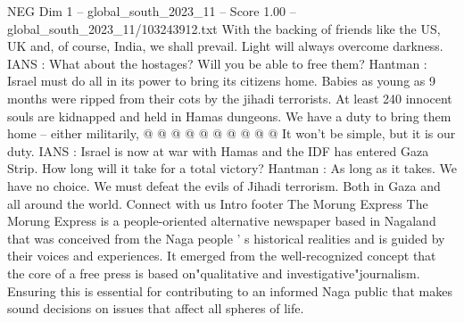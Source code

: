 \begin{textsample}{NEG Dim 1 – global\_south\_2023\_11 – Score 1.00 – global\_south\_2023\_11/103243912.txt}
With the backing of friends like the US, UK and, of course, India, we shall prevail.
Light will always overcome darkness.
IANS : What about the hostages?
Will you be able to free them?
Hantman : Israel must do all in its power to bring its citizens home.
Babies as young as 9 months were ripped from their cots by the jihadi terrorists.
At least 240 innocent souls are kidnapped and held in Hamas dungeons.
We have a duty to bring them home -- either militarily, @ @ @ @ @ @ @ @ @ @ It won't be simple, but it is our duty.
IANS : Israel is now at war with Hamas and the IDF has entered Gaza Strip.
How long will it take for a total victory?
Hantman : As long as it takes.
We have no choice.
We must defeat the evils of Jihadi terrorism.
Both in Gaza and all around the world.
Connect with us Intro footer The Morung Express The Morung Express is a people-oriented alternative newspaper based in Nagaland that was conceived from the Naga people ' s historical realities and is guided by their voices and experiences.
It emerged from the well-recognized concept that the core of a free press is based on"qualitative and investigative"journalism.
Ensuring this is essential for contributing to an informed Naga public that makes sound decisions on issues that affect all spheres of life.

\end{textsample}

